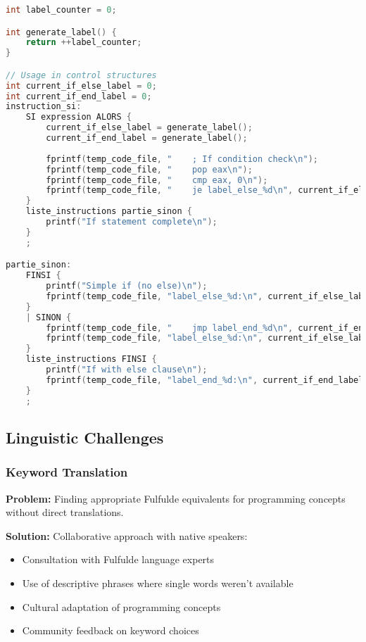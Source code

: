 \documentclass[12pt,a4paper]{article}
\begin{document}
\begin{lstlisting}[language=C, caption={Label Generation System}]
int label_counter = 0;

int generate_label() {
    return ++label_counter;
}

// Usage in control structures
int current_if_else_label = 0;
int current_if_end_label = 0;
instruction_si:
    SI expression ALORS {
        current_if_else_label = generate_label();
        current_if_end_label = generate_label();
        
        fprintf(temp_code_file, "    ; If condition check\n");
        fprintf(temp_code_file, "    pop eax\n");
        fprintf(temp_code_file, "    cmp eax, 0\n");
        fprintf(temp_code_file, "    je label_else_%d\n", current_if_else_label);
    }
    liste_instructions partie_sinon {
        printf("If statement complete\n");
    }
    ;

partie_sinon:
    FINSI {
        printf("Simple if (no else)\n");
        fprintf(temp_code_file, "label_else_%d:\n", current_if_else_label);
    }
    | SINON {
        fprintf(temp_code_file, "    jmp label_end_%d\n", current_if_end_label);
        fprintf(temp_code_file, "label_else_%d:\n", current_if_else_label);
    }
    liste_instructions FINSI {
        printf("If with else clause\n");
        fprintf(temp_code_file, "label_end_%d:\n", current_if_end_label);
    }
    ;
\end{lstlisting}

\subsection{Linguistic Challenges}

\subsubsection{Keyword Translation}

\textbf{Problem:} Finding appropriate Fulfulde equivalents for programming concepts without direct translations.

\textbf{Solution:} Collaborative approach with native speakers:
\begin{itemize}
    \item Consultation with Fulfulde language experts
    \item Use of descriptive phrases where single words weren't available
    \item Cultural adaptation of programming concepts
    \item Community feedback on keyword choices
\end{itemize}
\end{document}
